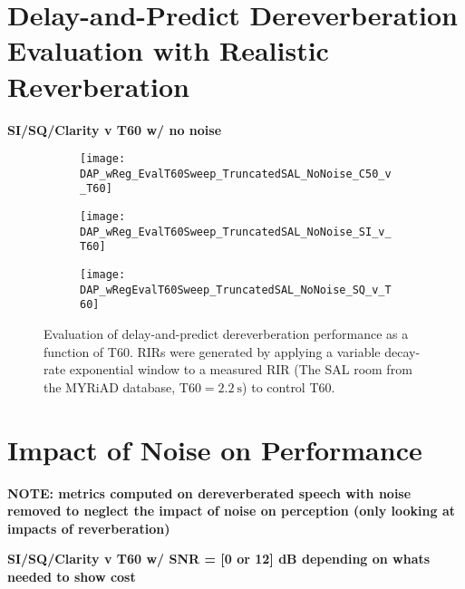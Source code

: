 \section{Delay-and-Predict Dereverberation Evaluation with Realistic Reverberation}

\textbf{SI/SQ/Clarity v T60 w/ no noise}

\begin{figure}[H]
	\centering
	\begin{subfigure}[b]{0.47\textwidth}
		\centering
		\texttt{[image: DAP\_wReg\_EvalT60Sweep\_TruncatedSAL\_NoNoise\_C50\_v\_T60]}
	\end{subfigure}
	\begin{subfigure}[b]{0.92\textwidth}
		\centering
		\texttt{[image: DAP\_wReg\_EvalT60Sweep\_TruncatedSAL\_NoNoise\_SI\_v\_T60]}
	\end{subfigure}
	\begin{subfigure}[b]{0.92\textwidth}
		\centering
		\texttt{[image: DAP\_wRegEvalT60Sweep\_TruncatedSAL\_NoNoise\_SQ\_v\_T60]}
	\end{subfigure}
	\caption{Evaluation of delay-and-predict dereverberation performance as a function of T60. RIRs were generated by applying a variable decay-rate exponential window to a measured RIR (The SAL room from the MYRiAD database, $\mathrm{T60} = \qty{2.2}{\second}$) to control T60.}
	\label{fig:DAP_wReg_EvalT60Sweep_TruncatedSAL_NoNoise}
\end{figure}


\section{Impact of Noise on Performance}

\textbf{NOTE: metrics computed on dereverberated speech with noise removed to  neglect the impact of noise on perception (only looking at impacts of reverberation)}

\textbf{SI/SQ/Clarity v T60 w/ SNR = [0 or 12] dB depending on whats needed to show cost}


